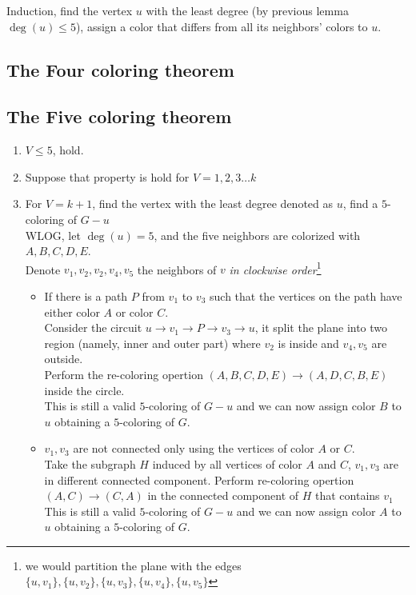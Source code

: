 \documentclass{article}
\begin{document}
Induction, find the vertex $u$ with the least degree (by previous lemma $\deg(u)\leq 5$), assign a color that differs from all its neighbors' colors to $u$.

\subsection{The Four coloring theorem}


\subsection{The Five coloring theorem}

\begin{enumerate}
	\item $V\leq 5$, hold.
	\item Suppose that property is hold for $V=1,2,3\ldots k$
	\item For $V=k+1$, find the vertex with the least degree denoted as $u$, find a $5$-coloring of $G-u$\\
	      WLOG, let $\deg(u)=5$, and the five neighbors are colorized with $A,B,C,D,E$.\\
	      Denote $v_1,v_2,v_2,v_4,v_5$ the neighbors of $v$ \emph{in clockwise order}\footnote{we would partition the plane with the edges $\{u,v_1\},\{u,v_2\},\{u,v_3\},\{u,v_4\},\{u,v_5\}$}\\
	      \begin{itemize}
		      \item If there is a path $P$ from $v_1$ to $v_3$ such that the vertices on the path have either color $A$ or color $C$.\\
		            Consider the circuit $u\to v_1\to P\to v_3\to u$, it split the plane into two region (namely, inner and outer part) where $v_2$ is inside and $v_4,v_5$ are outside.\\
		            Perform the re-coloring opertion $(A,B,C,D,E)\to (A,D,C,B,E)$ inside the circle.\\
		            This is still a valid $5$-coloring of $G-u$ and we can now assign color $B$ to $u$ obtaining a $5$-coloring of $G$.
		      \item $v_1,v_3$ are not connected only using the vertices of color $A$ or $C$.\\
		            Take the subgraph $H$ induced by all vertices of color $A$ and $C$, $v_1,v_3$ are in different connected component. Perform re-coloring opertion $(A,C)\to (C,A)$ in the connected component of $H$ that contains $v_1$\\
		            This is still a valid $5$-coloring of $G-u$ and we can now assign color $A$ to $u$ obtaining a $5$-coloring of $G$.
	      \end{itemize}
\end{enumerate}
\end{document}
